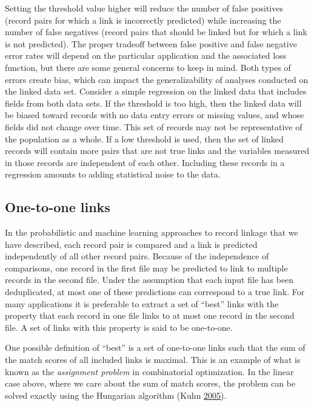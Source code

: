 \documentclass[]{krantz}
\begin{document}
Setting the threshold value higher will reduce the number of false
positives (record pairs for which a link is incorrectly predicted) while
increasing the number of false negatives (record pairs that should be
linked but for which a link is not predicted). The proper tradeoff
between false positive and false negative error rates will depend on the
particular application and the associated loss function, but there are
some general concerns to keep in mind. Both types of errors create bias,
which can impact the generalizability of analyses conducted on the
linked data set. Consider a simple regression on the linked data that
includes fields from both data sets. If the threshold is too high, then
the linked data will be biased toward records with no data entry errors
or missing values, and whose fields did not change over time. This set
of records may not be representative of the population as a whole. If a
low threshold is used, then the set of linked records will contain more
pairs that are not true links and the variables measured in those
records are independent of each other. Including these records in a
regression amounts to adding statistical noise to the data.

\subsection{One-to-one links}\label{one-to-one-links}

In the probabilistic and machine learning approaches to record linkage
that we have described, each record pair is compared and a link is
predicted independently of all other record pairs. Because of the
independence of comparisons, one record in the first file may be
predicted to link to multiple records in the second file. Under the
assumption that each input file has been deduplicated, at most one of
these predictions can correspond to a true link. For many applications
it is preferable to extract a set of ``best'' links with the property
that each record in one file links to at most one record in the second
file. A set of links with this property is said to be one-to-one.

One possible definition of ``best'' is a set of one-to-one links such
that the sum of the match scores of all included links is maximal. This
is an example of what is known as the \emph{assignment problem} in
combinatorial optimization. In the linear case above, where we care
about the sum of match scores, the problem can be solved exactly using
the Hungarian algorithm (Kuhn
\protect\hyperlink{ref-kuhn2005hungarian}{2005}).
\end{document}
